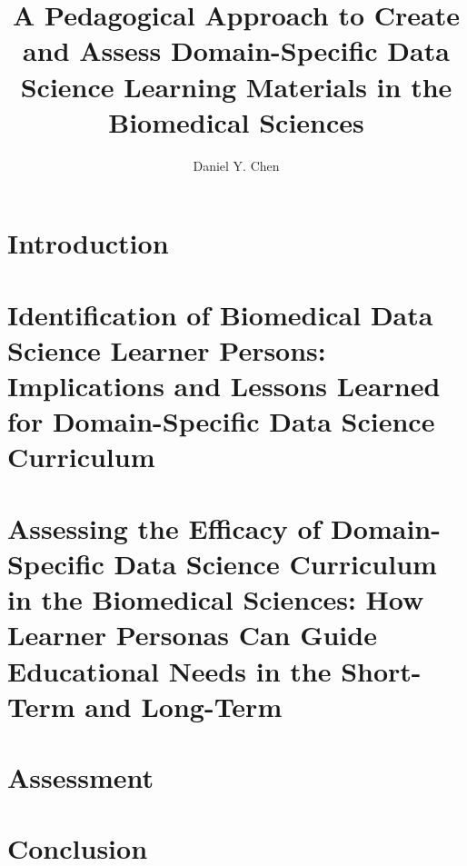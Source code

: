 \documentclass[doublespace,draft,nopageskip]{VTthesis} %
\title{A Pedagogical Approach
       to Create and Assess
       Domain-Specific
       Data Science Learning Materials
       in the Biomedical Sciences}
\author{Daniel Y. Chen}
\begin{document}
  \frontmatter
  \maketitle
  \tableofcontents

    \listoffigures
    \listoftables
    \printnomenclature %
    

    \mainmatter

    \chapter{Introduction}
        \label{ch:introduction}
        

    \chapter{Identification of Biomedical Data Science Learner Persons:
             Implications and Lessons Learned for Domain-Specific Data Science Curriculum}
        \label{ch:persona_validation}
        

    \chapter{Assessing the Efficacy of Domain-Specific Data Science Curriculum in the Biomedical Sciences:
             How Learner Personas Can Guide Educational Needs in the Short-Term and Long-Term}
        \label{ch:workshop}
        

    \chapter{Assessment}
        \label{ch:assessment}
        

    \chapter{Conclusion}
        \label{ch:conclusion}
        
\end{document}
